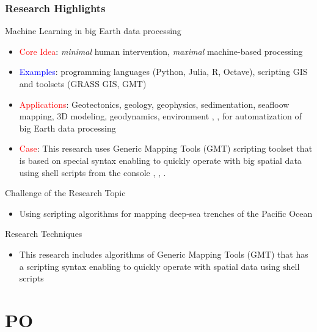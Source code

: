 \documentclass[pdflatex,compress,8pt,
	xcolor={dvipsnames,svgnames,x11names,table},
	hyperref={colorlinks = true,breaklinks = true, urlcolor = NavyBlue}]{beamer}
\begin{document}
\begin{frame}\frametitle{Research Highlights}
 
\begin{alertblock}{Machine Learning in big Earth data processing}
\begin{itemize}
	\item \textcolor{red}{Core Idea}: \emph{minimal} human intervention, \emph{maximal} machine-based processing
	\item \textcolor{blue}{Examples}: programming languages (Python, Julia, R, Octave), scripting GIS and toolsets (GRASS GIS, GMT)
	\item \textcolor{red}{Applications}: Geotectonics, geology, geophysics, sedimentation, seafloow mapping, 3D modeling, geodynamics, environment  \cite{Amanietal2019}, \cite{Lemenkova202104}, \cite{Lemenkova202105} for automatization of big Earth data processing
	\item \textcolor{red}{Case}: This research uses Generic Mapping Tools (GMT) scripting toolset that is based on special syntax enabling to quickly operate with big spatial data using shell scripts from the console \cite{Lemenkova202028}, \cite{Lemenkova202025}, \cite{Lemenkova202020}.
\end{itemize}
\end{alertblock}

\begin{exampleblock}{Challenge of the Research Topic}
\begin{itemize}
        	\item Using scripting algorithms for mapping deep-sea trenches of the Pacific Ocean
\end{itemize}
\end{exampleblock}
	
\begin{alertblock}{Research Techniques}
\begin{itemize}
	\item This research includes algorithms of Generic Mapping Tools (GMT) that has a scripting syntax enabling to quickly operate with spatial data using shell scripts
\end{itemize}
\end{alertblock}
\end{frame}

\section{PO}
\end{document}
